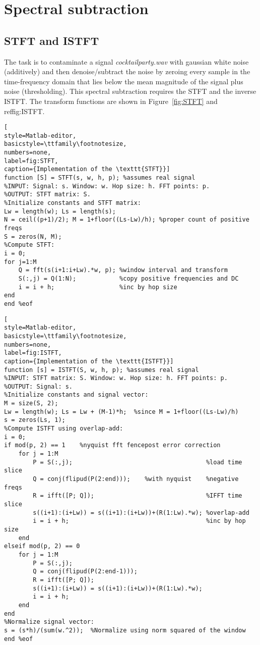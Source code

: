 \section{Spectral subtraction}

\subsection{STFT and ISTFT}
The task is to contaminate a signal \emph{cocktailparty.wav} with gaussian
white noise (additively) and then denoise/subtract the noise by zeroing every
sample in the time-frequency domain that lies below the mean magnitude of the
signal plus noise (thresholding). This spectral subtraction requires the STFT
and the inverse ISTFT. The transform functions are shown in
Figure~\ref{fig:STFT} and ref{fig:ISTFT}.

\begin{lstlisting}[
style=Matlab-editor,
basicstyle=\ttfamily\footnotesize,
numbers=none,
label=fig:STFT,
caption={Implementation of the \texttt{STFT}}]
function [S] = STFT(s, w, h, p); %assumes real signal
%INPUT: Signal: s. Window: w. Hop size: h. FFT points: p.
%OUTPUT: STFT matrix: S.
%Initialize constants and STFT matrix:
Lw = length(w); Ls = length(s);
N = ceil((p+1)/2); M = 1+floor((Ls-Lw)/h); %proper count of positive freqs
S = zeros(N, M);
%Compute STFT:
i = 0;
for j=1:M
    Q = fft(s(i+1:i+Lw).*w, p); %window interval and transform
    S(:,j) = Q(1:N);            %copy positive frequencies and DC
    i = i + h;                  %inc by hop size
end
end %eof
\end{lstlisting}
\begin{lstlisting}[
style=Matlab-editor,
basicstyle=\ttfamily\footnotesize,
numbers=none,
label=fig:ISTFT,
caption={Implementation of the \texttt{ISTFT}}]
function [s] = ISTFT(S, w, h, p); %assumes real signal
%INPUT: STFT matrix: S. Window: w. Hop size: h. FFT points: p.
%OUTPUT: Signal: s.
%Initialize constants and signal vector:
M = size(S, 2); 
Lw = length(w); Ls = Lw + (M-1)*h;  %since M = 1+floor((Ls-Lw)/h)
s = zeros(Ls, 1);
%Compute ISTFT using overlap-add:
i = 0;
if mod(p, 2) == 1    %nyquist fft fencepost error correction
    for j = 1:M
        P = S(:,j);                                     %load time slice
        Q = conj(flipud(P(2:end)));    %with nyquist    %negative freqs
        R = ifft([P; Q]);                               %IFFT time slice
        s((i+1):(i+Lw)) = s((i+1):(i+Lw))+(R(1:Lw).*w); %overlap-add
        i = i + h;                                      %inc by hop size
    end
elseif mod(p, 2) == 0
    for j = 1:M
        P = S(:,j);
        Q = conj(flipud(P(2:end-1)));
        R = ifft([P; Q]);
        s((i+1):(i+Lw)) = s((i+1):(i+Lw))+(R(1:Lw).*w);
        i = i + h;
    end
end
%Normalize signal vector:
s = (s*h)/(sum(w.^2));  %Normalize using norm squared of the window
end %eof
\end{lstlisting}

